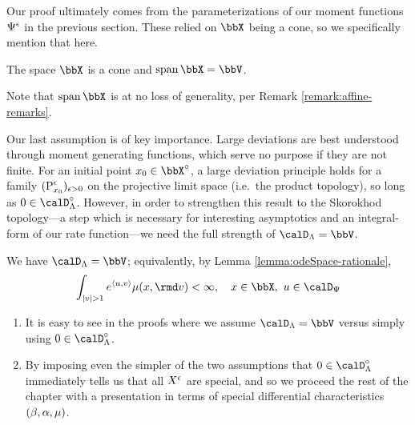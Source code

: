Our proof ultimately comes from the parameterizations of our moment functions $\Psi^\epsilon$ in the previous section.
These relied on $\stateSpace$ being a cone, so we specifically mention that here.
\begin{assumption}
  The space $\stateSpace$ is a cone and $\operatorname{span}\stateSpace = \vecSpace$.
\end{assumption}
\begin{remark}
  Note that $\operatorname{span}\stateSpace$ is at no loss of generality, per Remark \ref{remark:affine-remarks}.
\end{remark}

Our last assumption is of key importance.
Large deviations are best understood through moment generating functions, which serve no purpose if they are not finite.
For an initial point $\stateVar_0 \in \stateSpace^\circ$, a large deviation principle holds for a family $({\operatorname{P}}^\epsilon_{x_0})_{\epsilon>0}$ on the projective limit space (i.e.\ the product topology), so long as $0 \in \odeSpace^\circ$.
However, in order to strengthen this result to the Skorokhod topology---a step which is necessary for interesting asymptotics and an integral-form of our rate function---we need the full strength of $\odeSpace = \vecSpace$.
\begin{assumption}
  We have $\odeSpace = \vecSpace$; equivalently, by Lemma \ref{lemma:odeSpace-rationale},
  \begin{equation*}
    \int_{|\markVar| > 1} e^\prj{\momentVar}{\markVar} \affJump(\stateVar, \rmd\markVar) < \infty, \quad \stateVar \in \stateSpace, ~ \momentVar \in \momentSpace
  \end{equation*}
\end{assumption}
\begin{remark}
  \begin{enumerate}[label=(\alph*)]
    \item
      It is easy to see in the proofs where we assume $\odeSpace = \vecSpace$ versus simply using $0 \in \odeSpace^\circ$.
    \item
      By imposing even the simpler of the two assumptions that $0 \in \odeSpace^\circ$ immediately tells us that all $X^\epsilon$ are special, and so we proceed the rest of the chapter with a presentation in terms of special differential characteristics $(\beta, \alpha, \mu)$.
  \end{enumerate}
\end{remark}
